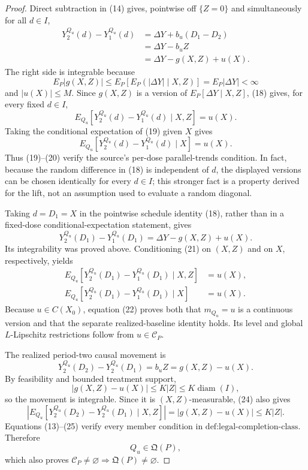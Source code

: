 \documentclass{article}
\begin{document}
\begin{proof}
Direct subtraction in (14) gives, pointwise off \(\{Z=0\}\) and simultaneously for all \(d\in I\),
\[
\begin{aligned}
Y_2^{Q_u}(d)-Y_1^{Q_u}(d)
&=\Delta Y+b_u(D_1-D_2)\\
&=\Delta Y-b_uZ\\
&=\Delta Y-g(X,Z)+u(X).
\end{aligned} \tag{18}
\]
The right side is integrable because
\[
E_P|g(X,Z)|
\leq E_P\!\left[E_P(|\Delta Y|\mid X,Z)\right]
=E_P|\Delta Y|<\infty
\]
and \(|u(X)|\leq M\). Since \(g(X,Z)\) is a version of \(E_P[\Delta Y\mid X,Z]\), (18) gives, for every fixed \(d\in I\),
\[
E_{Q_u}[Y_2^{Q_u}(d)-Y_1^{Q_u}(d)\mid X,Z]=u(X). \tag{19}
\]
Taking the conditional expectation of (19) given \(X\) gives
\[
E_{Q_u}[Y_2^{Q_u}(d)-Y_1^{Q_u}(d)\mid X]=u(X). \tag{20}
\]
Thus (19)--(20) verify the source's per-dose parallel-trends condition. In fact, because the random difference in (18) is independent of \(d\), the displayed versions can be chosen identically for every \(d\in I\); this stronger fact is a property derived for the lift, not an assumption used to evaluate a random diagonal.

Taking \(d=D_1=X\) in the pointwise schedule identity (18), rather than in a fixed-dose conditional-expectation statement, gives
\[
Y_2^{Q_u}(D_1)-Y_1^{Q_u}(D_1)
=\Delta Y-g(X,Z)+u(X). \tag{21}
\]
Its integrability was proved above. Conditioning (21) on \((X,Z)\) and on \(X\), respectively, yields
\[
\begin{aligned}
E_{Q_u}[Y_2^{Q_u}(D_1)-Y_1^{Q_u}(D_1)\mid X,Z]&=u(X),\\
E_{Q_u}[Y_2^{Q_u}(D_1)-Y_1^{Q_u}(D_1)\mid X]&=u(X).
\end{aligned} \tag{22}
\]
Because \(u\in C(X_0)\), equation (22) proves both that \(m_{Q_u}=u\) is a continuous version and that the separate realized-baseline identity holds. Its level and global \(L\)-Lipschitz restrictions follow from \(u\in\mathcal C_P\).

The realized period-two causal movement is
\[
Y_2^{Q_u}(D_2)-Y_2^{Q_u}(D_1)
=b_uZ=g(X,Z)-u(X). \tag{23}
\]
By feasibility and bounded treatment support,
\[
|g(X,Z)-u(X)|\leq K|Z|\leq K\operatorname{diam}(I), \tag{24}
\]
so the movement is integrable. Since it is \((X,Z)\)-measurable, (24) also gives
\[
\left|E_{Q_u}[Y_2^{Q_u}(D_2)-Y_2^{Q_u}(D_1)\mid X,Z]\right|
=|g(X,Z)-u(X)|
\leq K|Z|. \tag{25}
\]
Equations (13)--(25) verify every member condition in \(\text{def:legal-completion-class}\). Therefore
\[
Q_u\in\mathfrak Q(P), \tag{26}
\]
which also proves \(\mathcal C_P\neq\varnothing\Rightarrow\mathfrak Q(P)\neq\varnothing\).


\end{proof}
\end{document}
